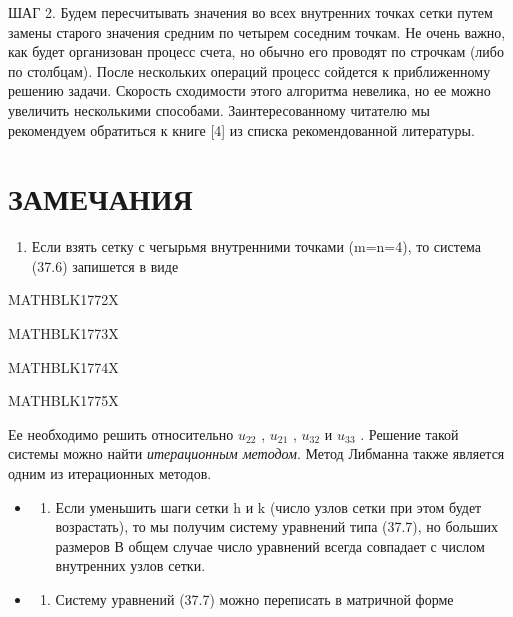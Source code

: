\documentclass[
]{article}
\providecommand{\tightlist}{%
  \setlength{\itemsep}{0pt}\setlength{\parskip}{0pt}}
\begin{document}
ШАГ 2. Будем пересчитывать значения во всех внутренних точках сетки
путем замены старого значения средним по четырем соседним точкам. Не
очень важно, как будет организован процесс счета, но обычно его проводят
по строчкам (либо по столбцам). После нескольких операций процесс
сойдется к приближенному решению задачи. Скорость сходимости этого
алгоритма невелика, но ее можно увеличить несколькими способами.
Заинтересованному читателю мы рекомендуем обратиться к книге {[}4{]} из
списка рекомендованной литературы.

\section{ЗАМЕЧАНИЯ}\label{ux437ux430ux43cux435ux447ux430ux43dux438ux44f-16}

\begin{enumerate}
\def\labelenumi{\arabic{enumi}.}
\tightlist
\item
  Если взять сетку с чегырьмя внутренними точками (m=n=4), то система
  (37.6) запишется в виде
\end{enumerate}

MATHBLK1772X

MATHBLK1773X

MATHBLK1774X

MATHBLK1775X

Ее необходимо решить относительно \(u_{22}\) , \(u_{21}\) , \(u_{32}\) и
\(u_{33}\) . Решение такой системы можно найти \emph{итерационным
методом}. Метод Либманна также является одним из итерационных методов.

\begin{itemize}
\tightlist
\item
  \begin{enumerate}
  \def\labelenumi{\arabic{enumi}.}
  \setcounter{enumi}{1}
  \tightlist
  \item
    Если уменьшить шаги сетки h и k (число узлов сетки при этом будет
    возрастать), то мы получим систему уравнений типа (37.7), но больших
    размеров В общем случае число уравнений всегда совпадает с числом
    внутренних узлов сетки.
  \end{enumerate}
\item
  \begin{enumerate}
  \def\labelenumi{\arabic{enumi}.}
  \setcounter{enumi}{2}
  \tightlist
  \item
    Систему уравнений (37.7) можно переписать в матричной форме
  \end{enumerate}
\end{itemize}
\end{document}
